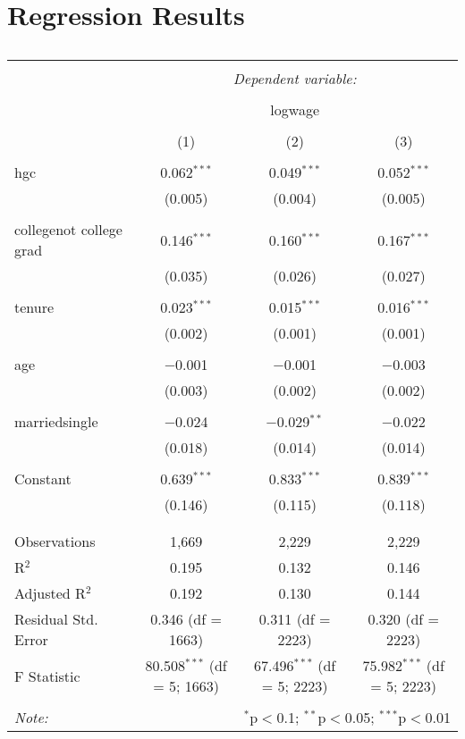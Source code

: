 \documentclass{article}
\begin{document}
\section{Regression Results}
\begin{table}[!htbp] \centering 
  \caption{} 
  \label{} 
\begin{tabular}{@{\extracolsep{5pt}}lccc} 
\\[-1.8ex]\hline 
\hline \\[-1.8ex] 
 & \multicolumn{3}{c}{\textit{Dependent variable:}} \\ 
\cline{2-4} 
\\[-1.8ex] & \multicolumn{3}{c}{logwage} \\ 
\\[-1.8ex] & (1) & (2) & (3)\\ 
\hline \\[-1.8ex] 
 hgc & 0.062$^{***}$ & 0.049$^{***}$ & 0.052$^{***}$ \\ 
  & (0.005) & (0.004) & (0.005) \\ 
  & & & \\ 
 collegenot college grad & 0.146$^{***}$ & 0.160$^{***}$ & 0.167$^{***}$ \\ 
  & (0.035) & (0.026) & (0.027) \\ 
  & & & \\ 
 tenure & 0.023$^{***}$ & 0.015$^{***}$ & 0.016$^{***}$ \\ 
  & (0.002) & (0.001) & (0.001) \\ 
  & & & \\ 
 age & $-$0.001 & $-$0.001 & $-$0.003 \\ 
  & (0.003) & (0.002) & (0.002) \\ 
  & & & \\ 
 marriedsingle & $-$0.024 & $-$0.029$^{**}$ & $-$0.022 \\ 
  & (0.018) & (0.014) & (0.014) \\ 
  & & & \\ 
 Constant & 0.639$^{***}$ & 0.833$^{***}$ & 0.839$^{***}$ \\ 
  & (0.146) & (0.115) & (0.118) \\ 
  & & & \\ 
\hline \\[-1.8ex] 
Observations & 1,669 & 2,229 & 2,229 \\ 
R$^{2}$ & 0.195 & 0.132 & 0.146 \\ 
Adjusted R$^{2}$ & 0.192 & 0.130 & 0.144 \\ 
Residual Std. Error & 0.346 (df = 1663) & 0.311 (df = 2223) & 0.320 (df = 2223) \\ 
F Statistic & 80.508$^{***}$ (df = 5; 1663) & 67.496$^{***}$ (df = 5; 2223) & 75.982$^{***}$ (df = 5; 2223) \\ 
\hline 
\hline \\[-1.8ex] 
\textit{Note:}  & \multicolumn{3}{r}{$^{*}$p$<$0.1; $^{**}$p$<$0.05; $^{***}$p$<$0.01} \\ 
\end{tabular} 
\end{table} 
\FloatBarrier
\end{document}
